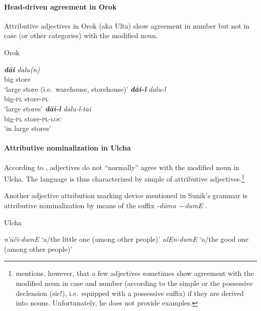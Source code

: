 \paragraph*{Head\hyp{}driven agreement in Orok}
Attributive adjectives in Orok (aka Ulta) show agreement in number but not in case (or other categories) with the modified noun.
\begin{exe}
\ex 
\rm{Orok \citep[55]{petrova1967}}
\begin{xlist}
\ex
\gll \textit{\textbf{dāi}} \textit{dalu(n)}\\
	big store\\
\glt ‘large store (i.e.~warehouse, storehouse)’
\ex 
\gll	\textit{\textbf{dāi-l}} \textit{dalu-l}\\
	big-\textsc{pl} store-\textsc{pl}\\
\glt	‘large stores’
\ex 
\gll	\textit{\textbf{dāi-l}} \textit{dalu-l-tai}\\
	big-\textsc{pl} store-\textsc{pl}-\textsc{loc}\\
\glt	‘in large stores’
\end{xlist}
\end{exe}

\paragraph*{Attributive nominalization in Ulcha}
According to \citet[36, 52–53]{sunik1985}, adjectives do not “normally” agree with the modified noun in Ulcha. The language is thus characterized by simple  of attributive adjectives.\footnote{\citet[36]{sunik1985} mentions, however, that a few adjectives sometimes show agreement with the modified noun in case and number (according to the simple or the possessive declension (sic!), i.e.~equipped with a possessive suffix) if they are derived into nouns. Unfortunately, he does not provide examples.}

Another adjective attribution marking device mentioned in Sunik's grammar is attributive nominalization by means of the suffix \textit{-d\.uma \textasciitilde-dumE} \citep{sunik1985}.
\begin{exe}
\ex 
\rm{Ulcha \citep[38]{sunik1985}}
\begin{xlist}
\ex \textit{n'ūči-dumE} \rm{‘a/the little one (among other people)’}
\ex \textit{ulEn-dumE} \rm{‘a/the good one (among other people)’}
\end{xlist}
\end{exe}

